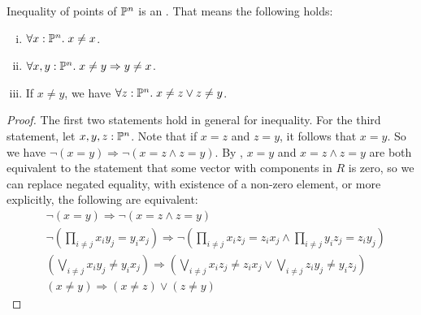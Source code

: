 \begin{lemma}%
  \label{projective-space-apartness-relation}
  Inequality of points of $\mathbb{P}^n$ is an .
  That means the following holds:
  \begin{enumerate}[(i)]
  \item $\forall x:\mathbb{P}^n.\; x\neq x$.
  \item $\forall x,y:\mathbb{P}^n.\; x\neq y\Rightarrow y\neq x$.
  \item If $x\neq y$, we have $\forall z:\mathbb{P}^n.\; x\neq z \vee z\neq y$.
  \end{enumerate}
\end{lemma}

\begin{proof}
  The first two statements hold in general for inequality.
  For the third statement, let $x,y,z:\mathbb{P}^n$.
  Note that if $x=z$ and $z=y$, it follows that $x=y$.
  So we have $\neg (x=y)\Rightarrow \neg (x=z\wedge z=y)$.
  By , $x=y$ and $x=z\wedge z=y$
  are both equivalent to the statement that some vector with components in $R$ is zero,
  so we can replace negated equality, with existence of a non-zero element,
  or more explicitly, the following are equivalent:
  \begin{align*}
    &\neg (x=y)\Rightarrow \neg (x=z\wedge z=y) \\
    &\neg \left(\prod_{i\neq j}x_iy_j=y_ix_j\right)
       \Rightarrow \neg \left(\prod_{i\neq j}x_iz_j=z_ix_j \wedge \prod_{i\neq j}y_iz_j=z_iy_j \right) \\
    & \left(\bigvee_{i\neq j}x_iy_j\neq y_ix_j\right) \Rightarrow \left(\bigvee_{i\neq j}x_iz_j\neq z_ix_j
       \vee \bigvee_{i\neq j}z_iy_j\neq y_iz_j\right) \\
    & (x\neq y) \Rightarrow (x\neq z) \vee (z\neq y)
  \end{align*}
\end{proof}

